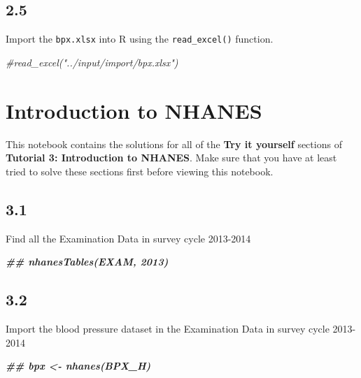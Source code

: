 \documentclass[
]{book}
\newenvironment{Shaded}{\begin{snugshade}}{\end{snugshade}}
\newcommand{\CommentTok}[1]{\textcolor[rgb]{0.56,0.35,0.01}{\textit{#1}}}
\newcommand{\DocumentationTok}[1]{\textcolor[rgb]{0.56,0.35,0.01}{\textbf{\textit{#1}}}}
\begin{document}
\hypertarget{section-13}{%
\subsection{2.5}\label{section-13}}

Import the \texttt{bpx.xlsx} into R using the \texttt{read\_excel()} function.

\begin{Shaded}
\begin{Highlighting}[]
\CommentTok{\#read\_excel("../input/import/bpx.xlsx")}
\end{Highlighting}
\end{Shaded}

\hypertarget{introduction-to-nhanes-2}{%
\section{Introduction to NHANES}\label{introduction-to-nhanes-2}}

This notebook contains the solutions for all of the \textbf{Try it yourself} sections of \textbf{Tutorial 3: Introduction to NHANES}. Make sure that you have at least tried to solve these sections first before viewing this notebook.

\hypertarget{section-14}{%
\subsection{3.1}\label{section-14}}

Find all the Examination Data in survey cycle 2013-2014

\begin{Shaded}
\begin{Highlighting}[]
\DocumentationTok{\#\# nhanesTables(\textquotesingle{}EXAM\textquotesingle{}, 2013)}
\end{Highlighting}
\end{Shaded}

\hypertarget{section-15}{%
\subsection{3.2}\label{section-15}}

Import the blood pressure dataset in the Examination Data in survey cycle 2013-2014

\begin{Shaded}
\begin{Highlighting}[]
\DocumentationTok{\#\# bpx \textless{}{-} nhanes(\textquotesingle{}BPX\_H\textquotesingle{})}
\end{Highlighting}
\end{Shaded}
\end{document}
